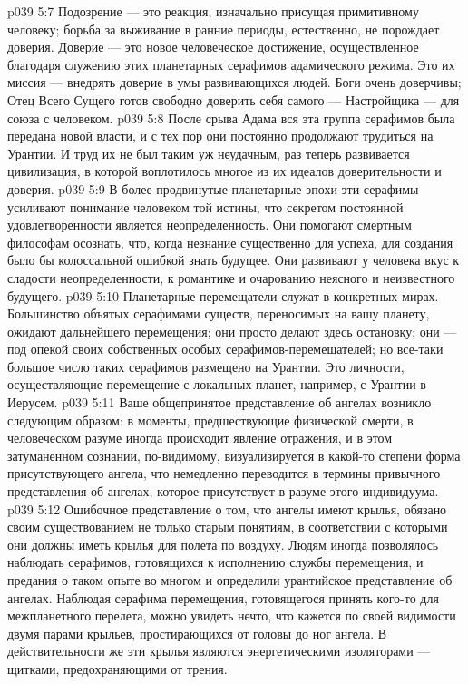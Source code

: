 \vs p039 5:7 \bibnobreakspace {} Подозрение --- это реакция, изначально присущая примитивному человеку; борьба за выживание в ранние периоды, естественно, не порождает доверия. Доверие --- это новое человеческое достижение, осуществленное благодаря служению этих планетарных серафимов адамического режима. Это их миссия --- внедрять доверие в умы развивающихся людей. Боги очень доверчивы; Отец Всего Сущего готов свободно доверить себя самого --- Настройщика --- для союза с человеком.
\vs p039 5:8 После срыва Адама вся эта группа серафимов была передана новой власти, и с тех пор они постоянно продолжают трудиться на Урантии. И труд их не был таким уж неудачным, раз теперь развивается цивилизация, в которой воплотилось многое из их идеалов доверительности и доверия.
\vs p039 5:9 В более продвинутые планетарные эпохи эти серафимы усиливают понимание человеком той истины, что секретом постоянной удовлетворенности является неопределенность. Они помогают смертным философам осознать, что, когда незнание существенно для успеха, для создания было бы колоссальной ошибкой знать будущее. Они развивают у человека вкус к сладости неопределенности, к романтике и очарованию неясного и неизвестного будущего.
\vs p039 5:10 \bibnobreakspace {} Планетарные перемещатели служат в конкретных мирах. Большинство объятых серафимами существ, переносимых на вашу планету, ожидают дальнейшего перемещения; они просто делают здесь остановку; они --- под опекой своих собственных особых серафимов\hyp{}перемещателей; но все\hyp{}таки большое число таких серафимов размещено на Урантии. Это личности, осуществляющие перемещение с локальных планет, например, с Урантии в Иерусем.
\vs p039 5:11 \pc Ваше общепринятое представление об ангелах возникло следующим образом: в моменты, предшествующие физической смерти, в человеческом разуме иногда происходит явление отражения, и в этом затуманенном сознании, по\hyp{}видимому, визуализируется в какой\hyp{}то степени форма присутствующего ангела, что немедленно переводится в термины привычного представления об ангелах, которое присутствует в разуме этого индивидуума.
\vs p039 5:12 Ошибочное представление о том, что ангелы имеют крылья, обязано своим существованием не только старым понятиям, в соответствии с которыми они должны иметь крылья для полета по воздуху. Людям иногда позволялось наблюдать серафимов, готовящихся к исполнению службы перемещения, и предания о таком опыте во многом и определили урантийское представление об ангелах. Наблюдая серафима перемещения, готовящегося принять кого\hyp{}то для межпланетного перелета, можно увидеть нечто, что кажется по своей видимости двумя парами крыльев, простирающихся от головы до ног ангела. В действительности же эти крылья являются энергетическими изоляторами --- щитками, предохраняющими от трения.
